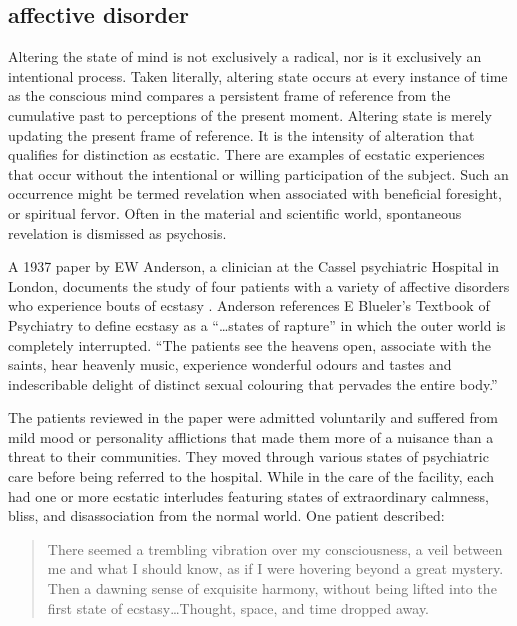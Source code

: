 \documentclass{UIdahoMastersThesis}
\begin{document}
\subsection{affective disorder}

Altering the state of mind is not exclusively a radical, nor is it exclusively an intentional process. Taken literally, altering state occurs at every instance of time as the conscious mind compares a persistent frame of reference from the cumulative past to perceptions of the present moment. Altering state is merely updating the present frame of reference. It is the intensity of alteration that qualifies for distinction as ecstatic. There are examples of ecstatic experiences that occur without the intentional or willing participation of the subject. Such an occurrence might be termed revelation when associated with beneficial foresight, or spiritual fervor. Often in the material and scientific world, spontaneous revelation is dismissed as psychosis.

A 1937 paper by EW Anderson, a clinician at the Cassel psychiatric Hospital in London, documents the study of four patients with a variety of affective disorders who experience bouts of ecstasy \cite{anderson_clinical_1938}. Anderson references E Blueler's Textbook of Psychiatry to define ecstasy as a ``\ldots states of rapture'' in which the outer world is completely interrupted. \enquote{The patients see the heavens open, associate with the saints, hear heavenly music, experience wonderful odours and tastes and indescribable delight of distinct sexual colouring that pervades the entire body.} 

The patients reviewed in the paper were admitted voluntarily and suffered from mild mood or personality afflictions that made them more of a nuisance than a threat to their communities. They moved through various states of psychiatric care before being referred to the hospital. While in the care of the facility, each had one or more ecstatic interludes featuring states of extraordinary calmness, bliss, and disassociation from the normal world. One patient described:

\begin{quote}
{There seemed a trembling vibration over my consciousness, a veil between me and what I should know, as if I were hovering beyond a great mystery. Then a dawning sense of exquisite harmony, without being lifted into the first state of ecstasy\ldots Thought, space, and time dropped away.}
\end{quote}
  
\end{document}
